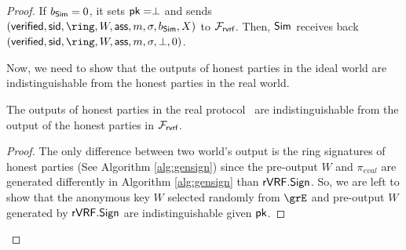 \begin{proof}
		 \noindent If $ b_{\mathsf{Sim}} = 0 $, it sets $ \mathsf{pk} = \perp $ and sends  $ (\oramsg{verified}, \sid, \ring, W,\aux, m, \sigma, b_\simulator, X) $ to $ \mathcal{F}_{\textsf{rvrf}} $. Then, $ \mathsf{Sim} $ receives back $ (\oramsg{verified}, \sid, \ring, W, \aux,m, \sigma, \perp, 0) $. 
			


	Now, we need to show that the outputs of honest parties in the ideal world are indistinguishable from the honest parties in the real world. 
	
	\begin{lemma}\label{lem:honestoutput}
			The outputs of honest parties in the real protocol \name\ are indistinguishable from the output of the honest parties in $ \mathcal{F}_{\textsf{rvrf}} $.
	\end{lemma}
		
		\begin{proof}
			 The only difference between two world's output is the ring signatures of honest parties (See Algorithm \ref{alg:gensign}) since the pre-output $ W $ and $ \pi_{eval} $ are generated differently in Algorithm \ref{alg:gensign} than $ {\mathsf{rVRF}}.{\mathsf{Sign}} $.  So, we are left to show that the anonymous key $ W $ selected randomly from $ \grE $ and pre-output $	 W $ generated by $ {\mathsf{rVRF}}.{\mathsf{Sign}} $ are indistinguishable given $ \mathsf{pk}  $. 
			

\end{proof}
\end{proof}
